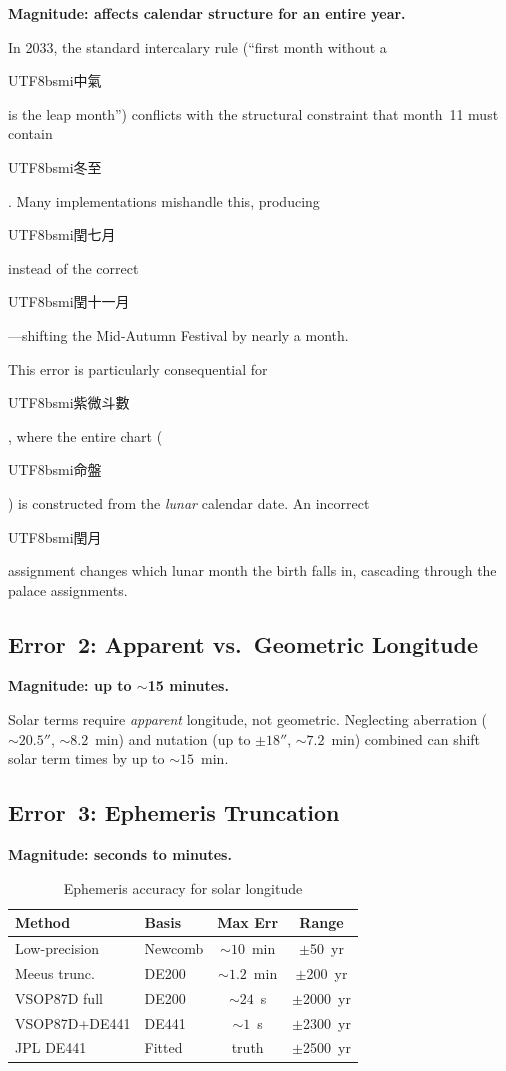 \documentclass[10pt,a4paper]{article}
\newcommand{\zh}[1]{\begin{CJK}{UTF8}{bsmi}#1\end{CJK}}
\begin{document}
\textbf{Magnitude: affects calendar structure for an entire year.}

In 2033, the standard intercalary rule (``first month without a \zh{中氣}
is the leap month'') conflicts with the structural constraint that month~11
must contain \zh{冬至} \cite{aslaksen2010, wikipedia_2033}. Many
implementations mishandle this, producing \zh{閏七月} instead of the
correct \zh{閏十一月} \cite{aslaksen_fake}---shifting the Mid-Autumn
Festival by nearly a month.

This error is particularly consequential for \zh{紫微斗數}, where the
entire chart (\zh{命盤}) is constructed from the \emph{lunar} calendar date.
An incorrect \zh{閏月} assignment changes which lunar month the birth
falls in, cascading through the palace assignments.

\subsection{Error~2: Apparent vs.\ Geometric Longitude}

\textbf{Magnitude: up to $\sim$15 minutes.}

Solar terms require \emph{apparent} longitude, not geometric. Neglecting
aberration ($\sim 20.5''$, $\sim 8.2$~min) and nutation (up to $\pm 18''$,
$\sim 7.2$~min) combined can shift solar term times by up to $\sim 15$~min.

\subsection{Error~3: Ephemeris Truncation}
\label{subsec:error_truncation}

\textbf{Magnitude: seconds to minutes.}

\begin{table}[H]
\centering
\caption{Ephemeris accuracy for solar longitude}
\label{tab:ephemeris}
\footnotesize
\begin{tabular}{llcc}
\toprule
\textbf{Method} & \textbf{Basis} & \textbf{Max Err} & \textbf{Range} \\
\midrule
Low-precision & Newcomb & $\sim 10$~min & $\pm$50~yr \\
Meeus trunc. & DE200 & $\sim 1.2$~min & $\pm$200~yr \\
VSOP87D full & DE200 & $\sim 24$~s & $\pm$2000~yr \\
VSOP87D+DE441 & DE441 & $\sim 1$~s & $\pm$2300~yr \\
JPL DE441 & Fitted & truth & $\pm$2500~yr \\
\bottomrule
\end{tabular}
\end{table}
\end{document}
